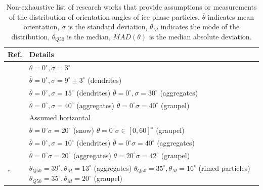 \documentclass[draft]{agujournal2019}
\begin{document}
 \begin{table}
 \caption{Non-exhaustive list of research works that provide assumptions or measurements of the distribution of orientation angles of ice phase particles. $\overline{\theta}$ indicates mean orientation, $\sigma$ is the standard deviation,  $\theta_{M}$ indicates the mode of the distribution, $\theta_{Q50}$ is the median, $MAD(\theta)$ is the median absolute deviation.}
 \label{table:orientations}
 \centering
 \begin{tabular}{l p{80mm}} 
 \hline
  Ref.   & Details \\
 \hline
   \cite{Matrosov_JAM_2001} & $\overline{\theta} = 0^\circ, \sigma = 3^\circ$ \\
   \hline
   \cite{Matrosov_JAS_2005} & $\overline{\theta} = 0^\circ, \sigma = 9^\circ \pm3^\circ$ (dendrites) \\
   \hline
    \cite{Kennedy_JAMC_2011}  &   $\overline{\theta} = 0^\circ, \sigma = 15^\circ$ (dendrites) \newline $\overline{\theta} = 0^\circ, \sigma = 30^\circ$ (aggregates)     \\
   \hline
    \cite{Ryzhkov_JAMC_2011} & $\overline{\theta} = 0^\circ, \sigma = 40^\circ$ (aggregates) \newline 
   $\overline{\theta} = 0^\circ \sigma = 40^\circ$ (graupel) \\
   \hline
   \cite{Hogan_JAMC_2012} & Assumed horizontal  \\
   \hline   
   \cite{Putnam_MWR_2017} & $\overline{\theta} = 0^\circ \sigma = 20^\circ$ (snow) \newline 
   $\overline{\theta} = 0^\circ \sigma \in [0,60]^\circ$ (graupel) \\
   \hline
   \cite{Bukovic_JAMC_2018} &  $\overline{\theta} = 0^\circ, \sigma = 10^\circ$ (dendrites) \newline  $\overline{\theta} = 0^\circ \sigma = 40^\circ$ (aggregates) \\
   \hline
    \cite{Matsui_JGRA_2019}  & $\overline{\theta} = 0^\circ \sigma = 20^\circ$ (aggregates) \newline 
   $\overline{\theta} = 20^\circ \sigma = 42^\circ$ (graupel) \\
   \hline
   \cite{Garrett_GRL_2015}$^*$ & $\theta_{Q50} = 39^\circ, \theta_{M} = 13^\circ$ (aggregates) \newline
   $\theta_{Q50} = 35^\circ, \theta_{M} = 16^\circ$ (rimed particles) \newline
   $\theta_{Q50} = 35^\circ, \theta_{M} = 20^\circ$ (graupel) \newline

\end{tabular}
\end{table}
\end{document}
